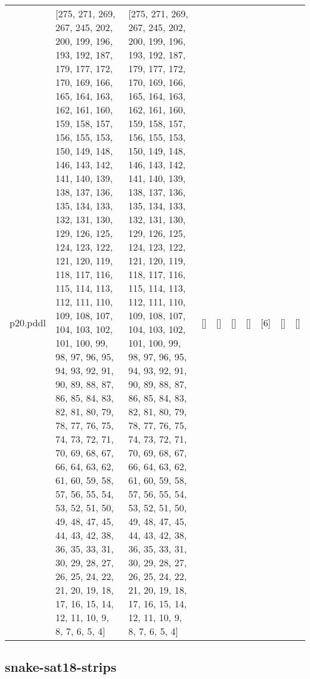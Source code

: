 \documentclass{article}
\begin{document}
\begin{tabular}{@{}lrrrrrrrrr@{}}
p20.pddl & \multicolumn{1}{|l|}{[275, 271, 269, 267, 245, 202, 200, 199, 196, 193, 192, 187, 179, 177, 172, 170, 169, 166, 165, 164, 163, 162, 161, 160, 159, 158, 157, 156, 155, 153, 150, 149, 148, 146, 143, 142, 141, 140, 139, 138, 137, 136, 135, 134, 133, 132, 131, 130, 129, 126, 125, 124, 123, 122, 121, 120, 119, 118, 117, 116, 115, 114, 113, 112, 111, 110, 109, 108, 107, 104, 103, 102, 101, 100, 99, 98, 97, 96, 95, 94, 93, 92, 91, 90, 89, 88, 87, 86, 85, 84, 83, 82, 81, 80, 79, 78, 77, 76, 75, 74, 73, 72, 71, 70, 69, 68, 67, 66, 64, 63, 62, 61, 60, 59, 58, 57, 56, 55, 54, 53, 52, 51, 50, 49, 48, 47, 45, 44, 43, 42, 38, 36, 35, 33, 31, 30, 29, 28, 27, 26, 25, 24, 22, 21, 20, 19, 18, 17, 16, 15, 14, 12, 11, 10, 9, 8, 7, 6, 5, 4]} & \multicolumn{1}{|l|}{[275, 271, 269, 267, 245, 202, 200, 199, 196, 193, 192, 187, 179, 177, 172, 170, 169, 166, 165, 164, 163, 162, 161, 160, 159, 158, 157, 156, 155, 153, 150, 149, 148, 146, 143, 142, 141, 140, 139, 138, 137, 136, 135, 134, 133, 132, 131, 130, 129, 126, 125, 124, 123, 122, 121, 120, 119, 118, 117, 116, 115, 114, 113, 112, 111, 110, 109, 108, 107, 104, 103, 102, 101, 100, 99, 98, 97, 96, 95, 94, 93, 92, 91, 90, 89, 88, 87, 86, 85, 84, 83, 82, 81, 80, 79, 78, 77, 76, 75, 74, 73, 72, 71, 70, 69, 68, 67, 66, 64, 63, 62, 61, 60, 59, 58, 57, 56, 55, 54, 53, 52, 51, 50, 49, 48, 47, 45, 44, 43, 42, 38, 36, 35, 33, 31, 30, 29, 28, 27, 26, 25, 24, 22, 21, 20, 19, 18, 17, 16, 15, 14, 12, 11, 10, 9, 8, 7, 6, 5, 4]} & \multicolumn{1}{|l|}{[]} & \multicolumn{1}{|l|}{[]} & \multicolumn{1}{|l|}{[]} & \multicolumn{1}{|l|}{[]} & \multicolumn{1}{|l|}{[6]} & \multicolumn{1}{|l|}{[]} & \multicolumn{1}{|l|}{[]} \\
\end{tabular}

\hypertarget{h_values-snake-sat18-strips}{}
\subsection*{snake-sat18-strips}
\end{document}
